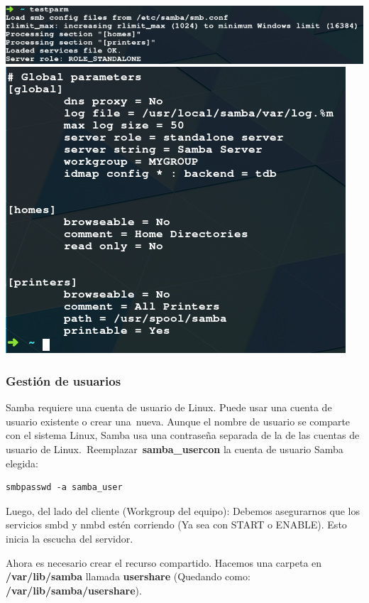 \documentclass[12pt]{extarticle}
\begin{document}
\includegraphics{images/testparm1.png}
\includegraphics{images/testparm2.png}

\subsubsection{Gestión de usuarios}\label{gestiuxf3n-de-usuarios}

Samba requiere una cuenta de usuario de Linux. Puede usar una cuenta de
usuario existente o crear una~nueva. Aunque el nombre de usuario se
comparte con el sistema Linux, Samba usa una contraseña separada de la
de las cuentas de usuario de Linux.~Reemplazar~\textbf{samba\_usercon}
la cuenta de usuario Samba elegida:

\begin{verbatim}
smbpasswd -a samba_user
\end{verbatim}

Luego, del lado del cliente (Workgroup del equipo): Debemos asegurarnos
que los servicios smbd y nmbd estén corriendo (Ya sea con START o
ENABLE). Esto inicia la escucha del servidor.

Ahora es necesario crear el recurso compartido. Hacemos una carpeta en
\textbf{/var/lib/samba} llamada \textbf{usershare} (Quedando como:
\textbf{/var/lib/samba/usershare}).
\end{document}
